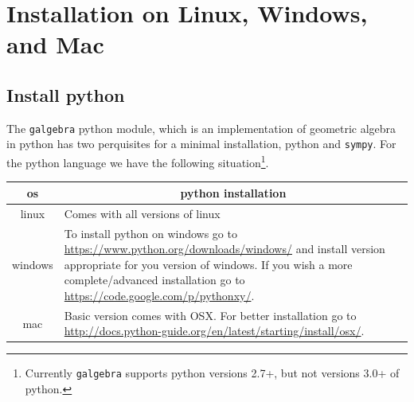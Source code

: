 \documentclass[12pt]{report}
\newcommand{\T}[1]{\texttt{#1}}
\begin{document}
\tableofcontents

\chapter{Installation on Linux, Windows, and Mac}

\section{Install python}
The \T{galgebra} python module, which is an implementation of geometric algebra in python has two
perquisites for a minimal installation, python and \T{sympy}. For the python language we have the
following situation\footnote{Currently \T{galgebra} supports python versions 2.7+, but not versions 3.0+ of python.}.
\begin{center}
\begin{tabular}{cl}
os & \multicolumn{1}{c}{python installation} \vspace{5pt} \\ \hline
linux & \parbox{4in}{\vspace{5pt} Comes with all versions of linux\vspace{5pt}} \\ \hline
windows & \parbox{4in}{\vspace{5pt}To install python on windows go to \url{https://www.python.org/downloads/windows/} and install version
                       appropriate for you version of windows. If you wish a more complete/advanced installation go to
                       \url{https://code.google.com/p/pythonxy/}\vspace{5pt}.}\\  \hline
mac & \parbox{4in}{\vspace{5pt}Basic version comes with OSX. For better installation go to
                   \url{http://docs.python-guide.org/en/latest/starting/install/osx/}\vspace{5pt}.} \\ \hline
\end{tabular}
\end{center}
\end{document}
